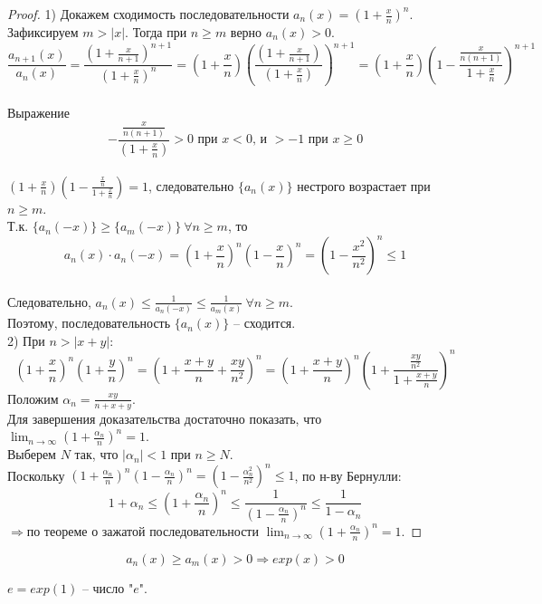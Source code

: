     \begin{proof}
        1) Докажем сходимость последовательности $a_{n} (x) = (1 + \frac{x}{n})^n$. Зафиксируем $m > |x|$. Тогда при $n \geq m$ верно $a_{n} (x) > 0$.
        \[\frac{a_{n+1}(x)}{a_{n}(x)} = \frac{\left(1 + \frac{x}{n+1}\right)^{n+1}}{\left(1 + \frac{x}{n}\right)^{n}} = \left(1 + \frac{x}{n}\right)\left(\frac{(1 + \frac{x}{n+1})}{(1 + \frac{x}{n})}\right)^{n+1} = \left(1 + \frac{x}{n}\right)\left(1 - \frac{\frac{x}{n(n+1)}}{1 + \frac{x}{n}}\right)^{n+1}\]
        \\
        Выражение
        \[- \frac{\frac{x}{n(n+1)}}{(1 + \frac{x}{n})} > 0 \text{ при $x < 0$, и $> -1$ при $x \geq 0$}\]
        \\
        $\left(1 + \frac{x}{n}\right)\left(1 - \frac{\frac{x}{n}}{1 + \frac{x}{n}}\right) = 1$, следовательно $\{a_{n}(x)\}$ нестрого возрастает при $n \geq m$.
        \\
        Т.к. $\{a_{n}(-x)\} \geq \{a_{m}(-x)\} \ \forall n \geq m$, то
        \[a_{n}(x) \cdot a_{n}(-x) = \left(1 + \frac{x}{n}\right)^{n}\left(1 - \frac{x}{n}\right)^{n} = \left(1 - \frac{x^{2}}{n^{2}}\right)^{n} \leq 1\]
        \\
        Следовательно, $a_{n}(x) \leq \frac{1}{a_{n}(-x)} \leq \frac{1}{a_{m}(x)} \ \forall n \geq m$.
        \\
        Поэтому, последовательность $\{a_{n}(x)\}$ -- сходится.
        \\
        2) При $n > |x + y|$: 
        \[\left(1 + \frac{x}{n}\right)^{n} \left(1 + \frac{y}{n}\right)^{n} = \left(1 + \frac{x + y}{n} + \frac{xy}{n^{2}}\right)^{n} = \left(1 + \frac{x+y}{n}\right)^{n}\left(1 + \frac{\frac{xy}{n^{2}}}{1 + \frac{x + y}{n}}\right)^{n}\]
        Положим $\alpha_{n} = \frac{xy}{n + x + y}$.
        \\
        Для завершения доказательства достаточно показать, что $\lim_{n \to \infty} \left(1 + \frac{\alpha_{n}}{n}\right)^{n} = 1$.
        \\
        Выберем $N$ так, что $|\alpha_{n}| < 1$ при $n \geq N$.
        \\
        Поскольку $\left(1 + \frac{\alpha_{n}}{n}\right)^{n}\left(1 - \frac{\alpha_{n}}{n}\right)^{n} = \left(1 - \frac{\alpha_{n}^{2}}{n^{2}}\right)^{n} \leq 1$, по н-ву Бернулли:
        \[1 + \alpha_{n} \leq \left(1 + \frac{\alpha_{n}}{n}\right)^{n} \leq \frac{1}{\left(1 - \frac{\alpha_{n}}{n}\right)^{n}} \leq \frac{1}{1 - \alpha_{n}}\]
        $\Rightarrow \text{по теореме о зажатой последовательности } \lim_{n \to \infty} \left(1 + \frac{\alpha_{n}}{n}\right)^{n} = 1$.
    \end{proof}
    
    \begin{note}
    \[a_{n}(x) \geq a_{m}(x) > 0 \Rightarrow exp(x) > 0\]
    \end{note}
    
    \begin{definition}
        $e = exp(1)$ -- число "$e$".
    \end{definition}
    
    